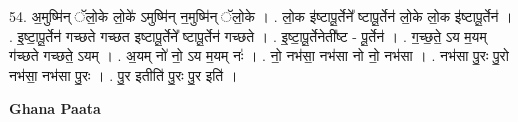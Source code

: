 \documentclass[17pt]{extarticle}
\begin{document}
54. अ॒मुष्मि॑न् ॅलो॒के लो॒के॑ ऽमुष्मि॑न् न॒मुष्मि॑न् ॅलो॒के । . लो॒क इ॑ष्टापू॒र्तेने᳚ ष्टापू॒र्तेन॑ लो॒के लो॒क इ॑ष्टापू॒र्तेन॑ । . इ॒ष्टा॒पू॒र्तेन॑ गच्छते गच्छत इष्टापू॒र्तेने᳚ ष्टापू॒र्तेन॑ गच्छते । . इ॒ष्टा॒पू॒र्तेनेती᳚ष्ट - पू॒र्तेन॑ । . ग॒च्छ॒ते॒ ऽय म॒यम् ग॑च्छते गच्छते॒ ऽयम् । . अ॒यम् नो॑ नो॒ ऽय म॒यम् नः॑ । . नो॒ नभ॑सा॒ नभ॑सा नो नो॒ नभ॑सा । . नभ॑सा पु॒रः पु॒रो नभ॑सा॒ नभ॑सा पु॒रः । . पु॒र इतीति॑ पु॒रः पु॒र इति॑ । \newline

\textbf{Ghana Paata } \newline
\end{document}
